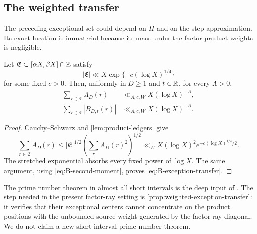 \subsection{The weighted transfer}

The preceding exceptional set could depend on $H$ and on the step
approximation.  Its exact location is immaterial because its mass under
the factor-product weights is negligible.

\begin{proposition}
\label{prop:weighted-exception-transfer}
Let $\mathfrak E\subset[\alpha X,\beta X]\cap\mathbb Z$ satisfy
\begin{equation}
 |\mathfrak E|\ll X
 \exp\{-c(\log X)^{1/4}\}
 \label{eq:generic-exception-size}
\end{equation}
for some fixed $c>0$.  Then, uniformly in $D\geq1$ and $t\in\mathbb R$, for
every $A>0$,
\begin{align}
 \sum_{r\in\mathfrak E}A_D(r)
 &\ll_{A,c,W}X(\log X)^{-A},
 \label{eq:A-exception-transfer}\\
 \sum_{r\in\mathfrak E}|B_{D,t}(r)|
 &\ll_{A,c,W}X(\log X)^{-A}.
 \label{eq:B-exception-transfer}
\end{align}
\end{proposition}

\begin{proof}
Cauchy--Schwarz and \cref{lem:product-ledgers} give
\[
 \sum_{r\in\mathfrak E}A_D(r)
 \leq|\mathfrak E|^{1/2}
 \left(\sum_rA_D(r)^2\right)^{1/2}
 \ll_WX(\log X)^2e^{-c(\log X)^{1/4}/2}.
\]
The stretched exponential absorbs every fixed power of $\log X$.  The
same argument, using \eqref{eq:B-second-moment}, proves
\eqref{eq:B-exception-transfer}.
\end{proof}

\begin{remark}
The prime number theorem in almost all short intervals is the deep input
of \citet{GuthMaynard2026}.  The step needed in the present factor-ray
setting is
\cref{prop:weighted-exception-transfer}: it verifies that their
exceptional centers cannot concentrate on the product positions with the
unbounded source weight generated by the factor-ray diagonal.  We do not
claim a new short-interval prime number theorem.
\end{remark}
